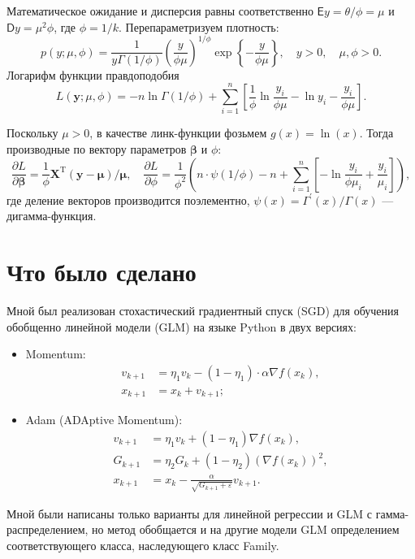 \documentclass[a4paper]{article}
\begin{document}
Математическое ожидание и дисперсия равны соответственно $\mathsf E y = \theta/\phi = \mu$ и $\mathsf D y = \mu^2 \phi$, где $\phi=1/k$. Перепараметризуем плотность:
\[
    p(y; \mu, \phi)=\frac{1}{y\Gamma(1/\phi)}\left(\frac{y}{\phi\mu}\right)^{1/\phi} \exp\left\{-\frac{y}{\phi\mu}\right\},\quad y > 0,\quad \mu,\phi>0.
\]
Логарифм функции правдоподобия
\[
    L(\mathbf{y}; \mu, \phi)=-n\ln\Gamma(1/\phi)+\sum_{i=1}^n\left[\frac1\phi\ln\frac{y_i}{\phi\mu} - \ln y_i- \frac{y_i}{\phi\mu} \right].
\]

Поскольку $\mu>0$, в качестве линк-функции фозьмем $g(x)=\ln(x)$. Тогда производные по вектору параметров $\bm\beta$ и $\phi$:
\[
    \frac{\partial L}{\partial \bm\beta}=\frac1\phi\mathbf{X}^\mathrm{T} (\mathbf{y} - \bm\mu) / \bm\mu,\quad \frac{\partial L}{\partial \phi}=\frac1{\phi^2}\left(n \cdot\psi(1 / \phi) - n + \sum_{i=1}^n\left[-\ln\frac{y_i}{\phi\mu_i}+ \frac{y_i}{\mu_i}\right]\right),
\]
где деление векторов производится поэлементно, $\psi(x)=\Gamma^\prime(x)/\Gamma(x)$ — дигамма-функция.

\section{Что было сделано}
Мной был реализован стохастический градиентный спуск (SGD) для обучения обобщенно линейной модели (GLM) на языке Python в двух версиях:
\begin{itemize}
    \item Momentum:
          \begin{align*}
              v_{k+1} & = \eta_1 v_{k} - (1 - \eta_1) \cdot \alpha \nabla f(x_k), \\
              x_{k+1} & = x_k + v_{k+1};
          \end{align*}
    \item Adam (ADAptive Momentum):
          \begin{align*}
              v_{k+1} & = \eta_1 v_{k} + (1 - \eta_1)  \nabla f(x_k),               \\
              G_{k+1} & = \eta_2 G_{k} + (1 - \eta_2) \left(\nabla f(x_k)\right)^2, \\
              x_{k+1} & = x_k - \frac{\alpha}{\sqrt{G_{k+1} + \varepsilon}}v_{k+1}.
          \end{align*}
\end{itemize}
Мной были написаны только варианты для линейной регрессии и GLM с гамма-распределением, но метод обобщается и на другие модели GLM определением соответствующего класса, наследующего класс Family.
\end{document}
